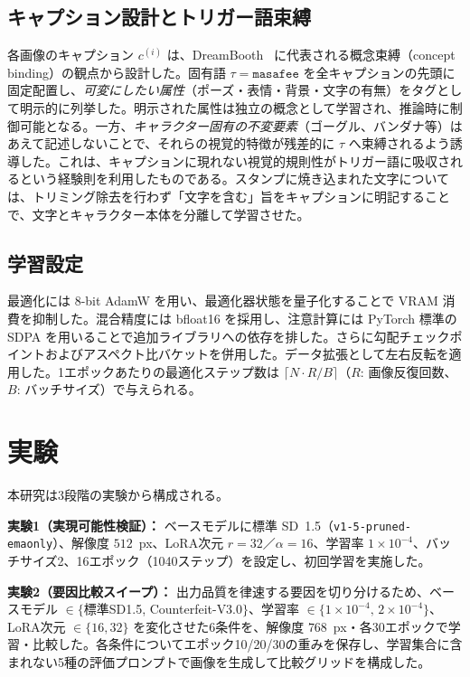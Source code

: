 \documentclass[10pt,twocolumn]{ltjsarticle}
\begin{document}
\subsection{キャプション設計とトリガー語束縛}
各画像のキャプション $c^{(i)}$ は、DreamBooth~\cite{ruiz2023dreambooth} に代表される概念束縛（concept binding）の観点から設計した。固有語 $\tau=\texttt{masafee}$ を全キャプションの先頭に固定配置し、\emph{可変にしたい属性}（ポーズ・表情・背景・文字の有無）をタグとして明示的に列挙した。明示された属性は独立の概念として学習され、推論時に制御可能となる。一方、\emph{キャラクター固有の不変要素}（ゴーグル、バンダナ等）はあえて記述しないことで、それらの視覚的特徴が残差的に $\tau$ へ束縛されるよう誘導した。これは、キャプションに現れない視覚的規則性がトリガー語に吸収されるという経験則を利用したものである。スタンプに焼き込まれた文字については、トリミング除去を行わず「文字を含む」旨をキャプションに明記することで、文字とキャラクター本体を分離して学習させた。

\subsection{学習設定}
最適化には 8-bit AdamW を用い、最適化器状態を量子化することで VRAM 消費を抑制した。混合精度には bfloat16 を採用し、注意計算には PyTorch 標準の SDPA を用いることで追加ライブラリへの依存を排した。さらに勾配チェックポイントおよびアスペクト比バケットを併用した。データ拡張として左右反転を適用した。1エポックあたりの最適化ステップ数は $\lceil N\cdot R/B\rceil$（$R$: 画像反復回数、$B$: バッチサイズ）で与えられる。

\section{実験}
本研究は3段階の実験から構成される。

\textbf{実験1（実現可能性検証）：} ベースモデルに標準 SD~1.5（\texttt{v1-5-pruned-emaonly}）、解像度 $512$~px、LoRA次元 $r=32$／$\alpha=16$、学習率 $1\!\times\!10^{-4}$、バッチサイズ2、16エポック（1040ステップ）を設定し、初回学習を実施した。

\textbf{実験2（要因比較スイープ）：} 出力品質を律速する要因を切り分けるため、ベースモデル $\in\{$標準SD1.5, Counterfeit-V3.0$\}$、学習率 $\in\{1\!\times\!10^{-4},\,2\!\times\!10^{-4}\}$、LoRA次元 $\in\{16,32\}$ を変化させた6条件を、解像度 $768$~px・各30エポックで学習・比較した。各条件についてエポック10/20/30の重みを保存し、学習集合に含まれない5種の評価プロンプトで画像を生成して比較グリッドを構成した。
\end{document}
